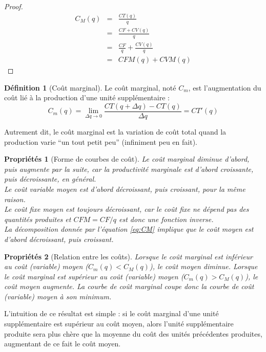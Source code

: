 \documentclass[
]{book}
\newtheorem{proposition}{Propriétés}[chapter]
\theoremstyle{definition}
\newtheorem{definition}{Définition}[chapter]
\theoremstyle{definition}
\theoremstyle{definition}
\theoremstyle{definition}
\theoremstyle{remark}
\begin{document}
\begin{proof}
\[
\begin{array}{rcl}
C_M(q) &=& \frac{CT(q)}{q}\\
 &=& \frac{CF + CV(q)}{q}\\
 &=& \frac{CF}{q}+\frac{CV(q)}{q}\\
 &=& CFM(q) + CVM(q)
\end{array}
\]
\end{proof}

\begin{definition}[Coût marginal]
Le coût marginal, noté \(C_m\), est l'augmentation du coût lié à la production d'une unité supplémentaire :
\[C_m(q)=\lim_{\Delta q\to 0}\frac{CT(q+\Delta q)-CT(q)}{\Delta q}=CT'(q)\]
\end{definition}

Autrement dit, le coût marginal est la variation de coût total quand la production varie ``un tout petit peu'' (infiniment peu en fait).

\begin{proposition}[Forme de courbes de coût]
Le coût marginal diminue d'abord, puis augmente par la suite, car la productivité marginale est d'abord croissante, puis décroissante, en général.\\
Le coût variable moyen est d'abord décroissant, puis croissant, pour la même raison.\\
Le coût fixe moyen est toujours décroissant, car le coût fixe ne dépend pas des quantités produites et \(CFM=CF/q\) est donc une fonction inverse.\\
La décomposition donnée par l'équation \eqref{eq:CM} implique que le coût moyen est d'abord décroissant, puis croissant.
\end{proposition}

\begin{proposition}[Relation entre les coûts]
Lorsque le coût marginal est inférieur au coût (variable) moyen (\(C_m(q)<C_M(q)\)), le coût moyen diminue.
Lorsque le coût marginal est supérieur au coût (variable) moyen (\(C_m(q)>C_M(q)\)), le coût moyen augmente.
La courbe de coût marginal coupe donc la courbe de coût (variable) moyen à son minimum.
\end{proposition}

L'intuition de ce résultat est simple : si le coût marginal d'une unité supplémentaire est supérieur au coût moyen, alors l'unité supplémentaire produite sera plus chère que la moyenne du coût des unités précédentes produites, augmentant de ce fait le coût moyen.
\end{document}
